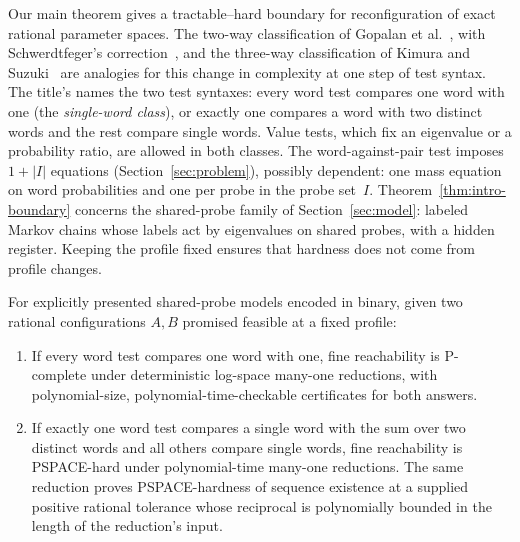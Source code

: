 Our main theorem gives a tractable--hard boundary for reconfiguration of
exact rational parameter spaces. The two-way classification of Gopalan
et al.~\cite{gopalan}, with Schwerdtfeger's
correction~\cite{schwerdtfeger}, and the three-way classification of Kimura and
Suzuki~\cite{kimurasuzuki} are analogies for this change in complexity at
one step of test syntax.
The title's  names the two test syntaxes:
every word test compares one word with one (the \emph{single-word class}),
or exactly one compares a word with two distinct words and the rest compare
single words.
Value tests, which fix an eigenvalue or a probability ratio, are allowed in
both classes. The word-against-pair test imposes $1+|I|$ equations
(Section~\ref{sec:problem}), possibly dependent: one mass equation on word
probabilities and one per probe in the probe set~$I$.
Theorem~\ref{thm:intro-boundary} concerns the shared-probe family of
Section~\ref{sec:model}: labeled Markov chains whose labels act by eigenvalues
on shared probes, with a hidden register. Keeping the profile fixed ensures
that hardness does not come from profile changes.

\begin{theorem}\label{thm:intro-boundary}
For explicitly presented shared-probe models encoded in binary, given two
rational configurations $A,B$ promised feasible at a fixed profile:
\begin{enumerate}
\item[(i)] If every word test compares one word with one, fine reachability
is P-complete under deterministic log-space many-one reductions, with
polynomial-size, polynomial-time-checkable certificates for both answers.
\item[(ii)] If exactly one word test compares a single word with the sum over
two distinct words and all others compare single words, fine reachability is
PSPACE-hard under polynomial-time many-one reductions. The same reduction
proves PSPACE-hardness of sequence existence at a supplied positive rational
tolerance whose reciprocal is polynomially bounded in the length of the
reduction's input.
\end{enumerate}
\end{theorem}

